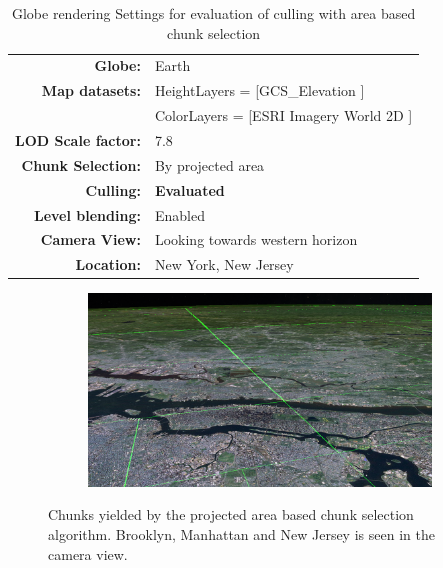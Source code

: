 \begin{table}[h]
  \centering
  \caption[]{Globe rendering Settings for evaluation of culling with area based chunk selection}
  \label{table:cullingasettings}
  \begin{tabular}{| r l |}
    \hline
      \textbf{Globe:}             & Earth \\
      \textbf{Map datasets:}      & HeightLayers = [GCS\_Elevation \cite{worldelevation3d}] \\
                                  & ColorLayers = [ESRI Imagery World 2D \cite{imageryworld2d}] \\
      \textbf{LOD Scale factor:}  & 7.8 \\
      \textbf{Chunk Selection:}    & By projected area \\
      \textbf{Culling:}           & \textbf{Evaluated} \\
      \textbf{Level blending:}    & Enabled \\
      \textbf{Camera View:}       & Looking towards western horizon\\
      \textbf{Location:}          & New York, New Jersey\\
    \hline
  \end{tabular}
\end{table}

\begin{figure}[h]
    \centering
    \begin{subfigure}[bt]{1.0\textwidth}
        \includegraphics[width=\textwidth]{figures/results/culling/cam_a.png}
    \end{subfigure}
    \caption{Chunks yielded by the projected area based chunk selection algorithm. Brooklyn, Manhattan and New Jersey is seen in the camera view.}
    \label{fig:cullingacam}
\end{figure}

